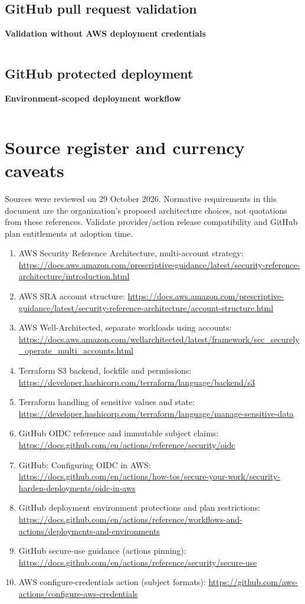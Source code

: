 \documentclass[10pt,letterpaper]{article}
\begin{document}
\subsection{GitHub pull request validation}
\noindent\textbf{Validation without AWS deployment credentials}\par
\inputminted[fontsize=\scriptsize,breaklines,breakanywhere,frame=lines]{text}{../examples/github/workflows/terraform-validate.yml}
\subsection{GitHub protected deployment}
\noindent\textbf{Environment-scoped deployment workflow}\par
\inputminted[fontsize=\scriptsize,breaklines,breakanywhere,frame=lines]{text}{../examples/github/workflows/terraform-deploy.yml}

\section{Source register and currency caveats}\label{sec:refs}
Sources were reviewed on 29 October 2026. Normative requirements in this document are the organization's proposed architecture choices, not quotations from these references. Validate provider/action release compatibility and GitHub plan entitlements at adoption time.
\begin{enumerate}
\item AWS Security Reference Architecture, multi-account strategy: \url{https://docs.aws.amazon.com/prescriptive-guidance/latest/security-reference-architecture/introduction.html}
\item AWS SRA account structure: \url{https://docs.aws.amazon.com/prescriptive-guidance/latest/security-reference-architecture/account-structure.html}
\item AWS Well-Architected, separate workloads using accounts: \url{https://docs.aws.amazon.com/wellarchitected/latest/framework/sec_securely_operate_multi_accounts.html}
\item Terraform S3 backend, lockfile and permissions: \url{https://developer.hashicorp.com/terraform/language/backend/s3}
\item Terraform handling of sensitive values and state: \url{https://developer.hashicorp.com/terraform/language/manage-sensitive-data}
\item GitHub OIDC reference and immutable subject claims: \url{https://docs.github.com/en/actions/reference/security/oidc}
\item GitHub: Configuring OIDC in AWS: \url{https://docs.github.com/en/actions/how-tos/secure-your-work/security-harden-deployments/oidc-in-aws}
\item GitHub deployment environment protections and plan restrictions: \url{https://docs.github.com/en/actions/reference/workflows-and-actions/deployments-and-environments}
\item GitHub secure-use guidance (actions pinning): \url{https://docs.github.com/en/actions/reference/security/secure-use}
\item AWS configure-credentials action (subject formats): \url{https://github.com/aws-actions/configure-aws-credentials}
\end{enumerate}
\end{document}
